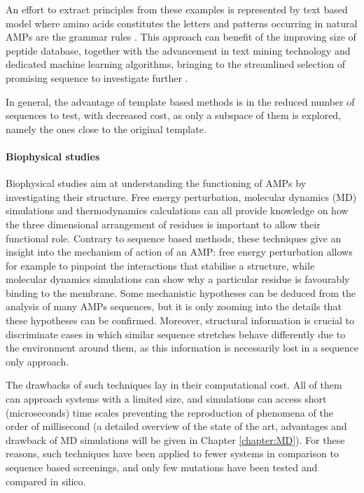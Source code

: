 An effort to extract principles from these examples is represented by text based model where amino acids constitutes the letters and patterns occurring in natural AMPs are the grammar rules \cite{Loose2006}.
This approach can benefit of the improving size of peptide database, together with the advancement in text mining technology and dedicated machine learning algorithms, bringing to the streamlined selection of promising sequence to investigate further \cite{Cipcigan2018}.

In general, the advantage of template based methods is in the reduced number of sequences to test, with decreased cost, as only a subspace of them is explored, namely the ones close to the original template.


\paragraph{Biophysical studies}
Biophysical studies aim at understanding the functioning of AMPs by investigating their structure. Free energy perturbation, molecular dynamics (MD) simulations and thermodynamics calculations can all provide knowledge on how the three dimensional arrangement of residues is important to allow their functional role.
%
Contrary to sequence based methods, these techniques give an insight into the mechanism of action of an AMP: free energy perturbation allows for example to pinpoint the interactions that stabilise a structure, while molecular dynamics simulations can show why a particular residue is favourably binding to the membrane. Some mechanistic hypotheses can be deduced from the analysis of many AMPs sequences, but it is only zooming into the details that these hypotheses can be confirmed. Moreover, structural information is crucial to discriminate cases in which similar sequence stretches behave differently due to the environment around them, as this information is necessarily lost in a sequence only approach.

The drawbacks of such techniques lay in their computational cost. All of them can approach systems with a limited size, and simulations can access short (microseconds) time scales preventing the reproduction of phenomena of the order of millisecond (a detailed overview of the state of the art, advantages and drawback of MD simulations will be given in Chapter \ref{chapter:MD}).
%
For these reasons, such techniques have been applied to fewer systems in comparison to sequence based screenings, and only few mutations have been tested and compared in silico.

